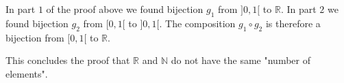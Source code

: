 \begin{enumerate}[i]
\noindent In part $1$ of the proof above we found bijection $g_1$ from $]0,1[$ to $\mathbb{R}$. In part $2$ we found bijection $g_2$ from $[0,1[$ to $]0,1[$. The composition $g_1 \circ g_2$ is therefore a bijection from $[0,1[$ to $\mathbb{R}$.  
\end{enumerate}
\noindent This concludes the proof that $\mathbb{R}$ and $\mathbb{N}$ do not have the same "number of elements".



